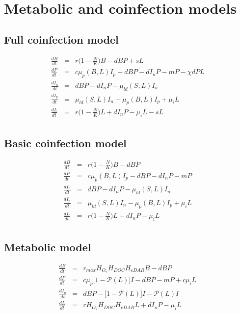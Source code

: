 \documentclass[10pt,a4paper,twoside,onecolumn, english]{report}
\begin{document}
\newcommand{\derivative}[1]{\frac{d #1}{dt}}


\section{Metabolic and coinfection models}

\subsection{Full coinfection model}
\begin{eqnarray*}
   \frac{dB}{dt}&=&r\big(1- \frac{N}{K}\big)B - dBP + sL\\
   \frac{dP}{dt}&=&c\mu_p(B,L)I_p - dBP -dI_nP - mP - \chi dPL \\
   \frac{dI_n}{dt}&=&dBP -dI_nP - \mu_{ld}(S,L)I_n \\
   \frac{dI_p}{dt}&=&\mu_{ld}(S,L)I_n - \mu_p(B,L)I_p + \mu_i L \\
   \frac{dL}{dt}&=&r\big(1- \frac{N}{K}\big)L + dI_nP - \mu_i L - sL \\
\end{eqnarray*}

\subsection{Basic coinfection model}
\begin{eqnarray*}
   \frac{dB}{dt}&=&r\big(1- \frac{N}{K}\big)B - dBP \\
   \frac{dP}{dt}&=&c\mu_p(B,L)I_p - dBP -dI_nP - mP \\
   \frac{dI_n}{dt}&=&dBP -dI_nP - \mu_{ld}(S,L)I_n \\
   \frac{dI_p}{dt}&=&\mu_{ld}(S,L)I_n - \mu_p(B,L)I_p + \mu_i L \\
   \frac{dL}{dt}&=&r\big(1- \frac{N}{K}\big)L + dI_nP - \mu_i L \\
\end{eqnarray*}

\subsection{Metabolic model}
\begin{eqnarray*}
   \frac{dB}{dt}&=&r_{max}H_{O_2}H_{DOC}H_{eDAR}B - dBP \\
   \frac{dP}{dt}&=&c\mu_p \big[1 - \mathcal{P}(L)\big]I - dBP - mP + c\mu_i L \\
   \frac{dI_n}{dt}&=&dBP - \big[1 - \mathcal{P}(L) \big] I - \mathcal{P}(L)I \\
   \frac{dL}{dt}&=&rH_{O_2}H_{DOC}H_{eDAR}L + dI_nP - \mu_i L \\
\end{eqnarray*}
\end{document}

